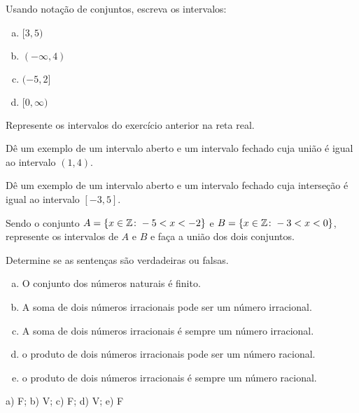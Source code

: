 \begin{secExercicios}
\begin{exer}
    Usando notação de conjuntos, escreva os intervalos:
    \begin{multicols}{2}
        \begin{enumerate}[a)]
            \item $[3,5)$
            \item $(-\infty,4)$
            \item $(-5,2]$
            \item $[0,\infty)$
        \end{enumerate}
    \end{multicols}
\end{exer}

\begin{exer}
    Represente os intervalos do exercício anterior na reta real.
\end{exer}

\begin{exer}
    Dê um exemplo de um intervalo aberto e um intervalo fechado cuja união é igual ao intervalo $(1,4)$.
\end{exer}

\begin{exer}
    Dê um exemplo de um intervalo aberto e um intervalo fechado cuja interseção é igual ao intervalo $[-3,5]$.
\end{exer}

\begin{exer}
    Sendo o conjunto $A = \{x\in \mathbb{Z} \colon -5 < x < -2\}$ e $B = \{x\in \mathbb{Z} \colon - 3 < x < 0\}$, represente os intervalos de $A$ e $B$ e faça a união dos dois conjuntos.
\end{exer}

\begin{exer}
    Determine se as sentenças são verdadeiras ou falsas.
    \begin{enumerate}[a)]
        \item O conjunto dos números naturais é finito.
        \item A soma de dois números irracionais pode ser um número irracional.
        \item A soma de dois números irracionais é sempre um número irracional.
        \item o produto de dois números irracionais pode ser um número racional.
        \item o produto de dois números irracionais é sempre um número racional.
    \end{enumerate}
\end{exer}
\begin{resp}
    a) F; b) V; c) F; d) V; e) F
\end{resp}


\end{secExercicios}
